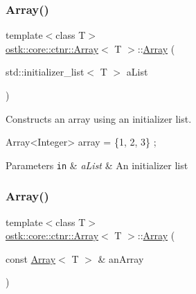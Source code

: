 \subsubsection{\texorpdfstring{Array()}{Array()}\hspace{0.1cm}{\footnotesize\ttfamily [5/8]}}
{\footnotesize\ttfamily template$<$class T$>$ \\
\hyperlink{classostk_1_1core_1_1ctnr_1_1_array}{ostk\+::core\+::ctnr\+::\+Array}$<$ T $>$\+::\hyperlink{classostk_1_1core_1_1ctnr_1_1_array}{Array} (\begin{DoxyParamCaption}\item[{std\+::initializer\+\_\+list$<$ T $>$}]{a\+List }\end{DoxyParamCaption})}



Constructs an array using an initializer list. 


\begin{DoxyCode}
Array<Integer> array = \{1, 2, 3\} ;
\end{DoxyCode}



\begin{DoxyParams}[1]{Parameters}
\mbox{\tt in}  & {\em a\+List} & An initializer list \\
\hline
\end{DoxyParams}
\mbox{\label{classostk_1_1core_1_1ctnr_1_1_array_aea744c067ca9d3f22ef7798cb977b59f}} 
\subsubsection{\texorpdfstring{Array()}{Array()}\hspace{0.1cm}{\footnotesize\ttfamily [6/8]}}
{\footnotesize\ttfamily template$<$class T$>$ \\
\hyperlink{classostk_1_1core_1_1ctnr_1_1_array}{ostk\+::core\+::ctnr\+::\+Array}$<$ T $>$\+::\hyperlink{classostk_1_1core_1_1ctnr_1_1_array}{Array} (\begin{DoxyParamCaption}\item[{const \hyperlink{classostk_1_1core_1_1ctnr_1_1_array}{Array}$<$ T $>$ \&}]{an\+Array }\end{DoxyParamCaption})\hspace{0.3cm}{\ttfamily [default]}}



